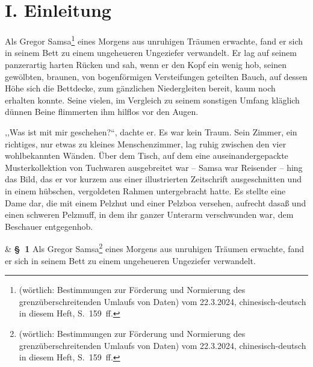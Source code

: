 \documentclass[]{zchinr}
\begin{document}

\zchinrprinttitle

\section{I. Einleitung}

Als Gregor Samsa\footnote{ (wörtlich: Bestimmungen zur Förderung und Normierung des grenzüberschreitenden Umlaufs von Daten) vom 22.3.2024, chinesisch-deutsch in diesem Heft, S.~159~ff.} eines Morgens aus unruhigen Träumen erwachte, fand er sich in seinem Bett zu einem ungeheueren Ungeziefer verwandelt. Er lag auf seinem panzerartig harten Rücken und sah, wenn er den Kopf ein wenig hob, seinen gewölbten, braunen, von bogenförmigen Versteifungen geteilten Bauch, auf dessen Höhe sich die Bettdecke, zum gänzlichen Niedergleiten bereit, kaum noch erhalten konnte. Seine vielen, im Vergleich zu seinem sonstigen Umfang kläglich dünnen Beine flimmerten ihm hilflos vor den Augen.

,,Was ist mit mir geschehen?``, dachte er. Es war kein Traum. Sein Zimmer, ein richtiges, nur etwas zu kleines Menschenzimmer, lag ruhig zwischen den vier wohlbekannten Wänden. Über dem Tisch, auf dem eine auseinandergepackte Musterkollektion von Tuchwaren ausgebreitet war -- Samsa war Reisender -- hing das Bild, das er vor kurzem aus einer illustrierten Zeitschrift ausgeschnitten und in einem hübschen, vergoldeten Rahmen untergebracht hatte. Es stellte eine Dame dar, die mit einem Pelzhut und einer Pelzboa versehen, aufrecht dasaß und einen schweren Pelzmuff, in dem ihr ganzer Unterarm verschwunden war, dem Beschauer entgegenhob.



\zchinrprinttitle

\begin{documentation}

 & \textbf{§~1} Als Gregor Samsa\footnote{ (wörtlich: Bestimmungen zur Förderung und Normierung des grenzüberschreitenden Umlaufs von Daten) vom 22.3.2024, chinesisch-deutsch in diesem Heft, S.~159~ff.} eines Morgens aus unruhigen Träumen erwachte, fand er sich in seinem Bett zu einem ungeheueren Ungeziefer verwandelt. \\

\end{documentation}
\end{document}
